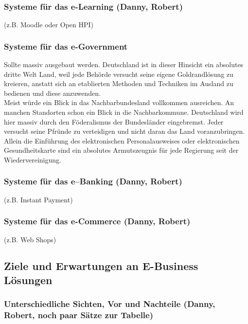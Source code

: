 \documentclass[notitlepage, hidelinks]{article}
\begin{document}
\subsubsection{Systeme für das e-Learning (Danny, Robert)} 
(z.B. Moodle oder Open HPI)

\subsubsection{Systeme für das e-Government}
Sollte massiv ausgebaut werden. Deutschland ist in dieser Hinsicht ein absolutes dritte Welt Land, weil jede Behörde versucht seine eigene Goldrandlösung zu kreieren, anstatt sich an etablierten Methoden und Techniken im Ausland zu bedienen und diese anzuwenden. \\
Meist würde ein Blick in das Nachbarbundesland vollkommen ausreichen. An manchen Standorten schon ein Blick in die Nachbarkommune. Deutschland wird hier massiv durch den Föderalismus der Bundesländer eingebremst. Jeder versucht seine Pfründe zu verteidigen und nicht daran das Land voranzubringen.
Allein die Einführung des elektronischen Personalausweises oder elektronischen Gesundheitskarte sind ein absolutes Armutszeugnis für jede Regierung seit der Wiedervereinigung. 

\subsubsection{Systeme für das e–Banking (Danny, Robert)}
(z.B. Instant Payment)
\subsubsection{Systeme für das e-Commerce (Danny, Robert)} 
(z.B. Web Shops)


\subsection{Ziele und Erwartungen an E-Business Lösungen}

\subsubsection{Unterschiedliche Sichten, Vor und Nachteile (Danny, Robert, noch paar Sätze zur Tabelle)}
\end{document}
